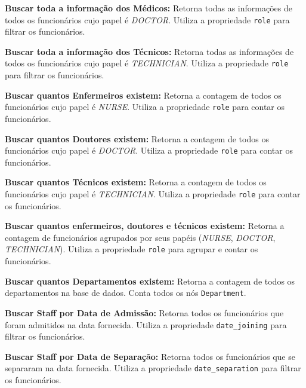 \vspace{0.15cm}
\textbf{Buscar toda a informação dos Médicos:} Retorna todas as informações de todos os funcionários cujo papel é \textit{DOCTOR}. Utiliza a propriedade \texttt{role} para filtrar os funcionários.

\vspace{0.15cm}
\textbf{Buscar toda a informação dos Técnicos:} Retorna todas as informações de todos os funcionários cujo papel é \textit{TECHNICIAN}. Utiliza a propriedade \texttt{role} para filtrar os funcionários.

\vspace{0.15cm}
\textbf{Buscar quantos Enfermeiros existem:} Retorna a contagem de todos os funcionários cujo papel é \textit{NURSE}. Utiliza a propriedade \texttt{role} para contar os funcionários.

\vspace{0.15cm}
\textbf{Buscar quantos Doutores existem:} Retorna a contagem de todos os funcionários cujo papel é \textit{DOCTOR}. Utiliza a propriedade \texttt{role} para contar os funcionários.

\vspace{0.15cm}
\textbf{Buscar quantos Técnicos existem:} Retorna a contagem de todos os funcionários cujo papel é \textit{TECHNICIAN}. Utiliza a propriedade \texttt{role} para contar os funcionários.

\vspace{0.15cm}
\textbf{Buscar quantos enfermeiros, doutores e técnicos existem:} Retorna a contagem de funcionários agrupados por seus papéis (\textit{NURSE}, \textit{DOCTOR}, \textit{TECHNICIAN}). Utiliza a propriedade \texttt{role} para agrupar e contar os funcionários.

\vspace{0.15cm}
\textbf{Buscar quantos Departamentos existem:} Retorna a contagem de todos os departamentos na base de dados. Conta todos os nós \texttt{Department}.

\vspace{0.15cm}
\textbf{Buscar Staff por Data de Admissão:} Retorna todos os funcionários que foram admitidos na data fornecida. Utiliza a propriedade \texttt{date\_joining} para filtrar os funcionários.

\vspace{0.15cm}
\textbf{Buscar Staff por Data de Separação:} Retorna todos os funcionários que se separaram na data fornecida. Utiliza a propriedade \texttt{date\_separation} para filtrar os funcionários.

